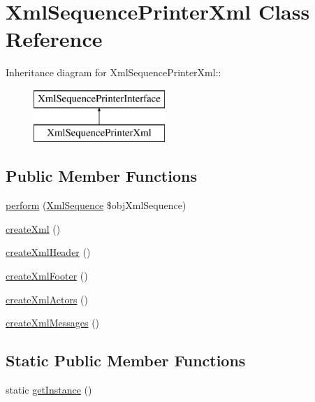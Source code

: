 \hypertarget{class_xml_sequence_printer_xml}{
\section{XmlSequencePrinterXml Class Reference}
\label{class_xml_sequence_printer_xml}
}
Inheritance diagram for XmlSequencePrinterXml::\begin{figure}[H]
\begin{center}
\leavevmode
\includegraphics[height=2cm]{class_xml_sequence_printer_xml}
\end{center}
\end{figure}
\subsection*{Public Member Functions}
\begin{CompactItemize}
\item 
\hyperlink{class_xml_sequence_printer_xml_7a8a4630e9f25847da0a6de87a5ab7e0}{perform} (\hyperlink{class_xml_sequence}{XmlSequence} \$objXmlSequence)
\item 
\hyperlink{class_xml_sequence_printer_xml_f99cdc771342f41dfbecb336a90f48d2}{createXml} ()
\item 
\hyperlink{class_xml_sequence_printer_xml_df4117a74e93f6f53e068d0859691cce}{createXmlHeader} ()
\item 
\hyperlink{class_xml_sequence_printer_xml_c983c2020c960b39e98ed05baec4aedd}{createXmlFooter} ()
\item 
\hyperlink{class_xml_sequence_printer_xml_65c529c6ee2e9bbdfd1baa8a5a8fe1a5}{createXmlActors} ()
\item 
\hyperlink{class_xml_sequence_printer_xml_aab9daae34ba6e135b791ec3eaad7c7d}{createXmlMessages} ()
\end{CompactItemize}
\subsection*{Static Public Member Functions}
\begin{CompactItemize}
\item 
static \hyperlink{class_xml_sequence_printer_xml_c93fbec81f07e5d15f80db907e63dc10}{getInstance} ()
\end{CompactItemize}

